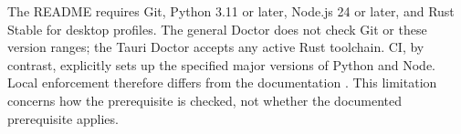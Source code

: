 The README requires Git, Python 3.11 or later, Node.js 24 or later, and Rust
Stable for desktop profiles. The general Doctor does not check Git or these
version ranges; the Tauri Doctor accepts any active Rust toolchain. CI, by
contrast, explicitly sets up the specified major versions of Python and Node.
Local enforcement therefore differs from the documentation
\parencite{kleiveist2026governance-snapshot,kleiveist2026ci}.
This limitation concerns how the prerequisite is checked, not whether the
documented prerequisite applies.
